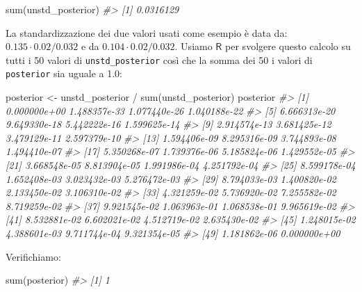 \documentclass[
]{memoir}
\newenvironment{Shaded}{\begin{snugshade}}{\end{snugshade}}
\newcommand{\CommentTok}[1]{\textcolor[rgb]{0.56,0.35,0.01}{\textit{#1}}}
\newcommand{\FunctionTok}[1]{\textcolor[rgb]{0.00,0.00,0.00}{#1}}
\newcommand{\NormalTok}[1]{#1}
\newcommand{\OtherTok}[1]{\textcolor[rgb]{0.56,0.35,0.01}{#1}}
\newcommand{\SpecialCharTok}[1]{\textcolor[rgb]{0.00,0.00,0.00}{#1}}
\newcommand{\R}{\textsf{R}} %
\begin{document}
\begin{Shaded}
\begin{Highlighting}[]
\FunctionTok{sum}\NormalTok{(unstd\_posterior)}
\CommentTok{\#\textgreater{} [1] 0.0316129}
\end{Highlighting}
\end{Shaded}

La standardizzazione dei due valori usati come esempio è data da: \(0.135 \cdot 0.02 / 0.032\) e da \(0.104 \cdot 0.02 / 0.032\). Usiamo \(\R\) per svolgere questo calcolo su tutti i 50 valori di \texttt{unstd\_posterior} così che la somma dei 50 i valori di \texttt{posterior} sia uguale a 1.0:

\begin{Shaded}
\begin{Highlighting}[]
\NormalTok{posterior }\OtherTok{\textless{}{-}}\NormalTok{ unstd\_posterior }\SpecialCharTok{/} \FunctionTok{sum}\NormalTok{(unstd\_posterior)}
\NormalTok{posterior}
\CommentTok{\#\textgreater{}  [1] 0.000000e+00 1.488357e{-}33 1.077440e{-}26 1.040188e{-}22}
\CommentTok{\#\textgreater{}  [5] 6.666313e{-}20 9.649330e{-}18 5.442222e{-}16 1.599625e{-}14}
\CommentTok{\#\textgreater{}  [9] 2.914574e{-}13 3.681425e{-}12 3.479129e{-}11 2.597379e{-}10}
\CommentTok{\#\textgreater{} [13] 1.594406e{-}09 8.295316e{-}09 3.744893e{-}08 1.494410e{-}07}
\CommentTok{\#\textgreater{} [17] 5.350268e{-}07 1.739376e{-}06 5.185824e{-}06 1.429552e{-}05}
\CommentTok{\#\textgreater{} [21] 3.668548e{-}05 8.813904e{-}05 1.991986e{-}04 4.251792e{-}04}
\CommentTok{\#\textgreater{} [25] 8.599178e{-}04 1.652408e{-}03 3.023432e{-}03 5.276472e{-}03}
\CommentTok{\#\textgreater{} [29] 8.794033e{-}03 1.400820e{-}02 2.133450e{-}02 3.106310e{-}02}
\CommentTok{\#\textgreater{} [33] 4.321259e{-}02 5.736920e{-}02 7.255582e{-}02 8.719259e{-}02}
\CommentTok{\#\textgreater{} [37] 9.921545e{-}02 1.063963e{-}01 1.068538e{-}01 9.965619e{-}02}
\CommentTok{\#\textgreater{} [41] 8.532881e{-}02 6.602021e{-}02 4.512719e{-}02 2.635430e{-}02}
\CommentTok{\#\textgreater{} [45] 1.248015e{-}02 4.388601e{-}03 9.711744e{-}04 9.321354e{-}05}
\CommentTok{\#\textgreater{} [49] 1.181862e{-}06 0.000000e+00}
\end{Highlighting}
\end{Shaded}

\noindent 
Verifichiamo:

\begin{Shaded}
\begin{Highlighting}[]
\FunctionTok{sum}\NormalTok{(posterior)}
\CommentTok{\#\textgreater{} [1] 1}
\end{Highlighting}
\end{Shaded}
\end{document}
